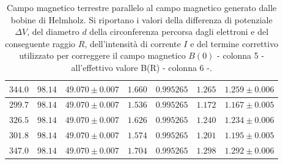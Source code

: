 \documentclass[]{article}
\begin{document}
\begin{table}[H]
\begin{tabular}{||c|c|c|c|c|c|c||}
    $344.0$ & $98.14$ & $49.070 \pm 0.007$ & $1.660$ & $0.995265$ & $1.265$ & $1.259 \pm 0.006$ \\\hline
    $299.7$ & $98.14$ & $49.070 \pm 0.007$ & $1.536$ & $0.995265$ & $1.172$ & $1.167 \pm 0.005$ \\\hline
    $326.5$ & $98.14$ & $49.070 \pm 0.007$ & $1.626$ & $0.995265$ & $1.240$ & $1.234 \pm 0.006$ \\\hline
    $301.8$ & $98.14$ & $49.070 \pm 0.007$ & $1.574$ & $0.995265$ & $1.201$ & $1.195 \pm 0.005$ \\\hline
    $347.0$ & $98.14$ & $49.070 \pm 0.007$ & $1.704$ & $0.995265$ & $1.298$ & $1.292 \pm 0.006$ \\\hline

\end{tabular}
    \caption{Campo magnetico terrestre parallelo al campo magnetico generato dalle bobine di Helmholz. Si riportano i valori della differenza di potenziale $\Delta V$, del diametro $ d $ della circonferenza percorsa dagli elettroni e del conseguente raggio $ R $, dell'intensità di corrente $ I $ e del termine correttivo utilizzato per correggere il campo magnetico $B(0)$ - colonna 5 - all'effettivo valore B(R) - colonna 6 -.}
    \label{CM_parallelo}
\end{table}
\end{document}
